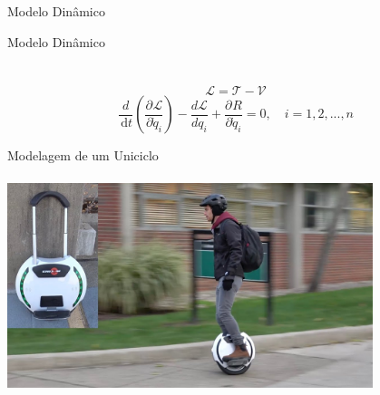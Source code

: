 \documentclass{beamer}
\newcommand{\df}[1]{\,\mathrm{d}#1}
\newcommand{\parcial}[3]{\dfrac{\partial^{#1}#2}{\partial #3^{#1}}}
\begin{document}
\begin{frame}{Modelo Dinâmico}
   
\end{frame}



\begin{frame}{Modelo Dinâmico}
    \framesubtitle{}
    \
    \begin{equation}
        \mathcal{L}= \mathcal{T} - \mathcal{V}
    \end{equation}
    \begin{equation}\label{eq:hamiles3}
        \frac{d}{\df{t}}\left( \parcial{}{\mathcal{L}}{\dot{q}_i}\right) - \frac{d \mathcal{L}}{d q_i} + \parcial{}{R}{\dot{q}_i}= 0, \quad i = 1,2,...,n
        \end{equation}
    
\end{frame}



\begin{frame}[c]{Modelagem de um Uniciclo}
    \framesubtitle{}
    \centering
    \includegraphics[width=0.8\textwidth]{images/unicycle.jpg}
\end{frame}
\end{document}
